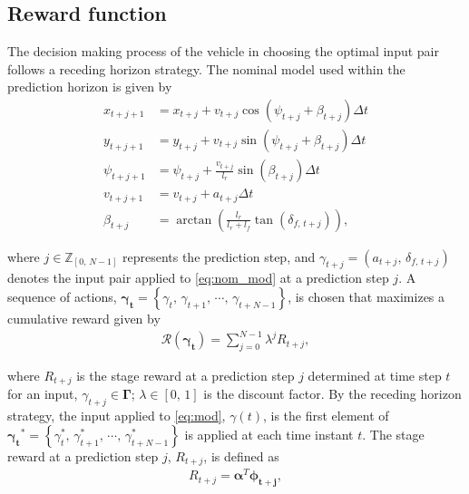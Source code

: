 \documentclass[10pt,journal]{IEEEtran}
\begin{document}
	\subsection{Reward function}
	\label{sec:reward_function}
	
	The decision making process of the vehicle in choosing the optimal input pair follows a receding horizon strategy. The nominal model used within the prediction horizon is given by
	\begin{subequations}
		\begin{align}
			x_{t+j+1} & = 	x_{t+j} + v_{t+j} \cos\left(\psi_{t+j} + \beta_{t+j} \right) \Delta t \\ 
			y_{t+j+1} & = 	y_{t+j} + v_{t+j} \sin\left(\psi_{t+j} + \beta_{t+j} \right) \Delta t  \\ 
			\psi_{t+j+1} & = 	\psi_{t+j} + \frac{v_{t+j}}{l_r} \sin\left( \beta _{t+j} \right) \Delta t \label{eq:psi_pred}\\ 
			v_{t+j+1} & = 	v_{t+j} + a_{t+j}  \Delta t \label{eq:v_pred}\\
			\beta_{t+j} & = \arctan\left(\frac{l_r}{l_r+l_f}\tan\left(\delta_{f,\,{t+j}}\right)\right) \label{eq:beta_pred},
		\end{align}
	\label{eq:nom_mod}
	\end{subequations}

	\noindent where $j \in \mathbb{Z}_{\left[0,\,N-1\right]}$  represents the prediction step, and $\gamma_{t+j} = \left(a_{t+j},\, \delta_{f,\,t+j}\right)$ denotes the input pair applied to \eqref{eq:nom_mod} at a prediction step $j$. A sequence of actions, $\boldsymbol{\gamma_{t}} = \left\{\gamma_{t},\,\gamma_{t+1},\,\cdots,\,\gamma_{t+N-1}\right\}$, is chosen that maximizes a cumulative reward given by
	\begin{align}
	\mathcal{R}\left(\boldsymbol{\gamma_{t}}\right) = \sum_{j=0}^{N-1} \lambda^{j} R_{t+j},
	\label{eq:cum_reward}
	\end{align}
	
	\noindent where $R_{t+j}$ is the stage reward at a prediction step $j$ determined at time step $t$ for an input, $\gamma_{t+j} \in  \boldsymbol{\Gamma}$; $\lambda \in \left[0,\,1\right]$ is the discount factor. By the receding horizon strategy, the input applied to \eqref{eq:mod}, $\gamma\left(t\right)$, is the first element of $\boldsymbol{\gamma_{t}}^* = \left\{\gamma_{t}^*,\,\gamma_{t+1}^*,\,\cdots,\,\gamma_{t+N-1}^*\right\}$ is applied at each time instant $t$. The stage reward at a prediction step $j$, $R_{t+j}$, is defined as
	 \begin{align}
	 R_{t+j} = \boldsymbol{{\alpha}}^T \boldsymbol{\phi_{t+j}},
	 \label{eq:stage_reward}
	 \end{align}
	
\end{document}

